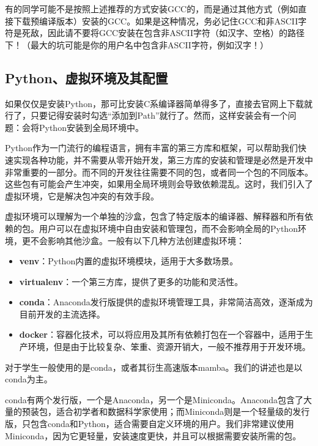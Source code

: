 \documentclass[../main.tex]{subfiles}
\begin{document}
\begin{caution}
  有的同学可能不是按照上述推荐的方式安装GCC的，而是通过其他方式（例如直接下载预编译版本）安装的GCC。如果是这种情况，务必记住GCC和非ASCII字符是死敌，因此请不要将GCC安装在包含非ASCII字符（如汉字、空格）的路径下！（最大的坑可能是你的用户名中包含非ASCII字符，例如汉字！）
\end{caution}

\subsection{Python、虚拟环境及其配置}\label{sec:virtualenv}

如果仅仅是安装Python，那可比安装C系编译器简单得多了，直接去官网上下载就行了，只要记得安装时勾选“添加到Path”就行了。然而，这样安装会有一个问题：会将Python安装到全局环境中。

Python作为一门流行的编程语言，拥有丰富的第三方库和框架，可以帮助我们快速实现各种功能，并不需要从零开始开发，第三方库的安装和管理是必然是开发中非常重要的一部分。而不同的开发往往需要不同的包，或者同一个包的不同版本。这些包有可能会产生冲突，如果用全局环境则会导致依赖混乱。这时，我们引入了虚拟环境，它是解决包冲突的有效手段。

虚拟环境可以理解为一个单独的沙盒，包含了特定版本的编译器、解释器和所有依赖的包。用户可以在虚拟环境中自由安装和管理包，而不会影响全局的Python环境，更不会影响其他沙盒。一般有以下几种方法创建虚拟环境：
\begin{itemize}
  \item \textbf{venv}：Python内置的虚拟环境模块，适用于大多数场景。
  \item \textbf{virtualenv}：一个第三方库，提供了更多的功能和灵活性。
  \item \textbf{conda}：Anaconda发行版提供的虚拟环境管理工具，非常简洁高效，逐渐成为目前开发的主流选择。
  \item \textbf{docker}：容器化技术，可以将应用及其所有依赖打包在一个容器中，适用于生产环境，但是由于比较复杂、笨重、资源开销大，一般不推荐用于开发环境。
\end{itemize}

对于学生一般使用的是conda，或者其衍生高速版本mamba。我们的讲述也是以conda为主。

conda有两个发行版，一个是Anaconda，另一个是Miniconda。Anaconda包含了大量的预装包，适合初学者和数据科学家使用；而Miniconda则是一个轻量级的发行版，只包含conda和Python，适合需要自定义环境的用户。我们非常建议使用Miniconda，因为它更轻量，安装速度更快，并且可以根据需要安装所需的包。
\end{document}
